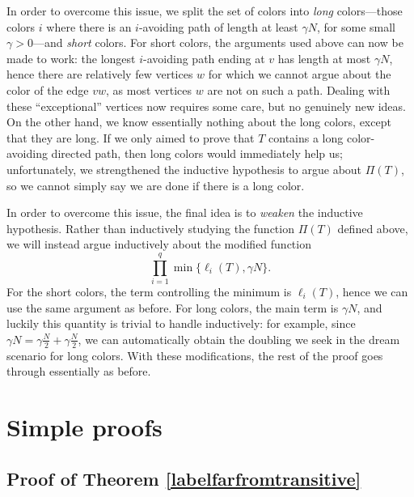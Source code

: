 \documentclass[11pt,reqno]{amsart}
\theoremstyle{definition}
\newcommand\1{\mathbf{1}}
\begin{document}
In order to overcome this issue, we split the set of colors into \emph{long} colors---those colors $i$ where there is an $i$-avoiding path of length at least $\gamma N$, for some small $\gamma>0$---and \emph{short} colors. For short colors, the arguments used above can now be made to work: the longest $i$-avoiding path ending at $v$ has length at most $\gamma N$, hence there are relatively few vertices $w$ for which we cannot argue about the color of the edge $vw$, as most vertices $w$ are not on such a path. Dealing with these ``exceptional'' vertices now requires some care, but no genuinely new ideas. On the other hand, we know essentially nothing about the long colors, except that they are long. If we only aimed to prove that $T$ contains a long color-avoiding directed path, then long colors would immediately help us; unfortunately, we strengthened the inductive hypothesis to argue about $\Pi(T)$, so we cannot simply say we are done if there is a long color.

In order to overcome this issue, the final idea is to \emph{weaken} the inductive hypothesis. Rather than inductively studying the function $\Pi(T)$ defined above, we will instead argue inductively about the modified function
\[
    \prod_{i=1}^q \min \{\ell_i(T), \gamma N\}.
\]
For the short colors, the term controlling the minimum is $\ell_i(T)$, hence we can use the same argument as before. For long colors, the main term is $\gamma N$, and luckily this quantity is trivial to handle inductively: for example, since $\gamma N=\gamma \frac N2 + \gamma \frac N2$, we can automatically obtain the doubling we seek in the dream scenario for long colors. With these modifications, the rest of the proof goes through essentially as before.



\section{Simple proofs}\label{sec:simple}
\subsection{Proof of Theorem \ref{labelfarfromtransitive}}
\end{document}
